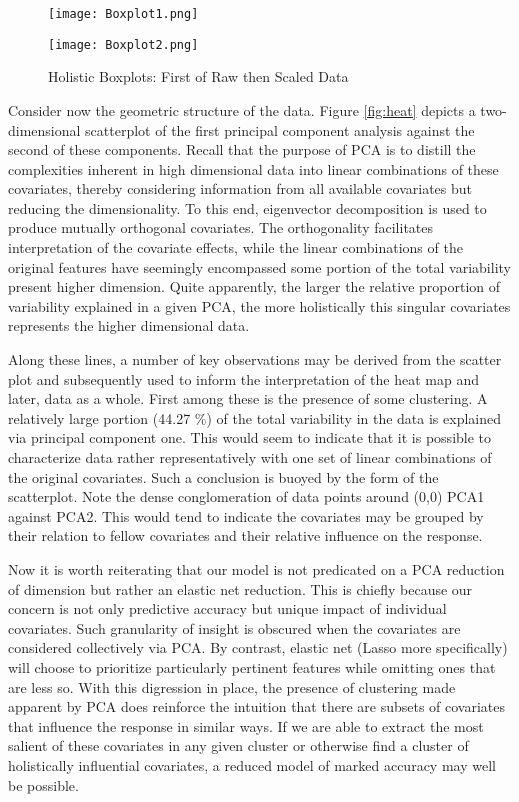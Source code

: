 \documentclass[10pt]{article}
\begin{document}
\begin{figure}[htbp]
\centering
\begin{minipage}{.5\textwidth}
	\centering
	\texttt{[image: Boxplot1.png]}
\end{minipage}%
\begin{minipage}{.5\textwidth}
	\centering
	\texttt{[image: Boxplot2.png]}
\end{minipage}%
\caption{Holistic Boxplots: First of Raw then Scaled Data}\label{fig:box}
\end{figure}
	
	
	Consider now the geometric structure of the data.  Figure \ref{fig:heat} depicts a two-dimensional scatterplot of the first principal component analysis against the second of these components.  Recall that the purpose of PCA is to distill the complexities inherent in high dimensional data into linear combinations of these covariates, thereby considering information from all available covariates but reducing the dimensionality.  To this end, eigenvector decomposition is used to produce mutually orthogonal covariates.  The orthogonality facilitates interpretation of the covariate effects, while the linear combinations of the original features have seemingly encompassed some portion of the total variability present higher dimension.  Quite apparently, the larger the relative proportion of variability explained in a given PCA, the more holistically this singular covariates represents the higher dimensional data.  
	
	Along these lines, a number of key observations may be derived from the scatter plot and subsequently used to inform the interpretation of the heat map and later, data as a whole.  First among these is the presence of some clustering.  A relatively large portion (44.27 \%) of the total variability in the data is explained via principal component one.  This would seem to indicate that it is possible to characterize data rather representatively with one set of linear combinations of the original covariates.  Such a conclusion is buoyed by the form of the scatterplot.  Note the dense conglomeration of data points around (0,0) PCA1 against PCA2.  This would tend to indicate the covariates may be grouped by their relation to fellow covariates and their relative influence on the response.  
	
	Now it is worth reiterating that our model is not predicated on a PCA reduction of dimension but rather an elastic net reduction.  This is chiefly because our concern is not only predictive accuracy but unique impact of individual covariates.  Such granularity of insight is obscured when the covariates are considered collectively via PCA.  By contrast, elastic net (Lasso more specifically) will choose to prioritize particularly pertinent features while omitting ones that are less so.  With this digression in place, the presence of clustering made apparent by PCA does reinforce the intuition that there are subsets of covariates that influence the response in similar ways.  If we are able to extract the most salient of these covariates in any given cluster or otherwise find a cluster of holistically influential covariates, a reduced model of marked accuracy may well be possible.  
	
\end{document}
